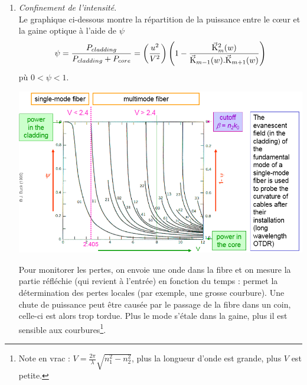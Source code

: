 \begin{enumerate}
\item \textit{Confinement de l'intensité}.\\
Le graphique ci-dessous montre la répartition de la puissance entre le cœur et la gaine optique
à l'aide de $\psi$
\begin{equation}
\psi  = \frac{{{P_{cladding}}}}{{{P_{cladding}} + {P_{core}}}}
 = \left( {\frac{{{u^2}}}{{{V^2}}}} \right)\left( {1 - \frac{{\vec{{\rm K}}_m^2(w)}}{{{\vec{{
 \rm K}}_{m - 1}}(w).{\vec{{\rm K}}_{m + 1}}(w)}}} \right)
\end{equation}
pù $0<\psi<1$.
\newpage
\begin{center}
	\includegraphics[scale=0.54]{ch1/image27}
\end{center}
Pour monitorer les pertes, on envoie une onde dans la fibre et on mesure la partie réfléchie
(qui revient à l'entrée) en fonction du temps : permet la détermination des pertes locales (par
exemple, une grosse courbure). Une chute de puissance peut être causée par le passage de la fibre
dans un coin, celle-ci est alors trop tordue. Plus le mode s'étale dans la gaine, plus il est 
sensible aux courbures\footnote{Note en vrac : $V = \frac{2\pi}{\lambda}\sqrt{n_1^2-n_2^2}$, plus
la longueur d'onde est grande, plus $V$ est petite.}.\\


\end{enumerate}

